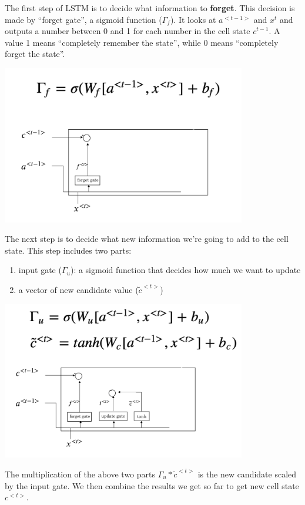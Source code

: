 \documentclass[12pt,]{krantz}
\providecommand{\tightlist}{%
  \setlength{\itemsep}{0pt}\setlength{\parskip}{0pt}}
\begin{document}
The first step of LSTM is to decide what information to \textbf{forget}. This decision is made by ``forget gate'', a sigmoid function (\(\Gamma_{f}\)). It looks at \(a^{<t-1>}\) and \(x^{t}\) and outputs a number between 0 and 1 for each number in the cell state \(c^{t-1}\). A value 1 means ``completely remember the state'', while 0 means ``completely forget the state''.

\includegraphics[width=0.8\textwidth,height=\textheight]{images/lstm1.png}

The next step is to decide what new information we're going to add to the cell state. This step includes two parts:

\begin{enumerate}
\def\labelenumi{\arabic{enumi}.}
\tightlist
\item
  input gate (\(\Gamma_{u}\)): a sigmoid function that decides how much we want to update
\item
  a vector of new candidate value (\(\tilde{c}^{<t>}\))
\end{enumerate}

\includegraphics[width=0.8\textwidth,height=\textheight]{images/lstm2.png}

The multiplication of the above two parts \(\Gamma_{u}*\tilde{c}^{<t>}\) is the new candidate scaled by the input gate. We then combine the results we get so far to get new cell state \(c^{<t>}\).
\end{document}
